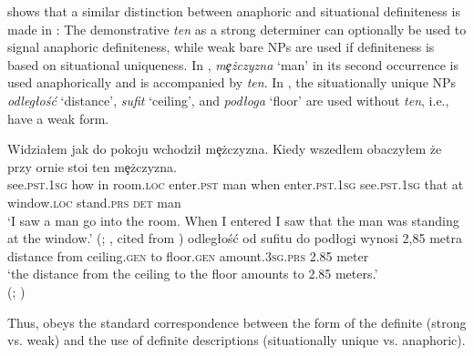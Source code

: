 \documentclass[output=paper]{langscibook}
\begin{document}
\noindent \citet{Czardybon2017} shows that a similar distinction between anaphoric and situational definiteness is made in : The demonstrative \textit{ten} as a strong determiner can optionally be used to signal anaphoric definiteness, while weak bare NPs are used if definiteness is based on situational uniqueness. In , \textit{mȩżczyzna} `man' in its second occurrence is used anaphorically and is accompanied by \textit{ten}. In , the situationally unique NPs \textit{odległość} `distance', \textit{sufit} `ceiling’, and \textit{podłoga} `floor' are used without \textit{ten}, i.e., have a weak form.


\ea \label{ex:8}
\ea
\gll Widziałem jak do pokoju wchodził mȩżczyzna. Kiedy wszedłem obaczyłem że przy ornie stoi ten mȩżczyzna. \\
    see.\textsc{pst}.1\textsc{sg} how in room.\textsc{loc} enter.\textsc{pst} man when enter.\textsc{pst}.1\textsc{sg} see.\textsc{pst}.1\textsc{sg} that at window.\textsc{loc} stand.\textsc{prs} \textsc{det} man\\
\glt `I saw a man go into the room. When I entered I saw that the man was standing at the window.' \glt \hfill (; \citealt[96--97]{Szwedek1976}, cited from \citealt[50]{Czardybon2017})\label{ex:8a}
\ex \gll [\dots] odległość od sufitu do podłogi wynosi 2,85 metra \\
 {} distance from ceiling.\textsc{gen} to floor.\textsc{gen} amount.3\textsc{sg.prs} 2.85 meter\\
\glt `the distance from the ceiling to the floor amounts to 2.85 meters.' \\
\glt \hfill (; \citealt[74]{Czardybon2017}) \label{ex:8b}
\z
\z

\noindent Thus,  obeys the standard correspondence between the form of the definite (strong vs. weak) and the use of definite descriptions (situationally unique vs. anaphoric).
\end{document}
